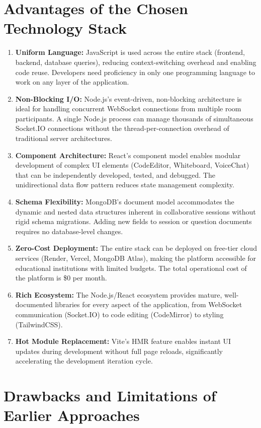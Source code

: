 \section{Advantages of the Chosen Technology Stack}

\begin{enumerate}[label=\arabic*.]
    \item \textbf{Uniform Language:} JavaScript is used across the entire stack (frontend, backend, database queries), reducing context-switching overhead and enabling code reuse. Developers need proficiency in only one programming language to work on any layer of the application.
    \item \textbf{Non-Blocking I/O:} Node.js's event-driven, non-blocking architecture is ideal for handling concurrent WebSocket connections from multiple room participants. A single Node.js process can manage thousands of simultaneous Socket.IO connections without the thread-per-connection overhead of traditional server architectures.
    \item \textbf{Component Architecture:} React's component model enables modular development of complex UI elements (CodeEditor, Whiteboard, VoiceChat) that can be independently developed, tested, and debugged. The unidirectional data flow pattern reduces state management complexity.
    \item \textbf{Schema Flexibility:} MongoDB's document model accommodates the dynamic and nested data structures inherent in collaborative sessions without rigid schema migrations. Adding new fields to session or question documents requires no database-level changes.
    \item \textbf{Zero-Cost Deployment:} The entire stack can be deployed on free-tier cloud services (Render, Vercel, MongoDB Atlas), making the platform accessible for educational institutions with limited budgets. The total operational cost of the platform is \$0 per month.
    \item \textbf{Rich Ecosystem:} The Node.js/React ecosystem provides mature, well-documented libraries for every aspect of the application, from WebSocket communication (Socket.IO) to code editing (CodeMirror) to styling (TailwindCSS).
    \item \textbf{Hot Module Replacement:} Vite's HMR feature enables instant UI updates during development without full page reloads, significantly accelerating the development iteration cycle.
\end{enumerate}

\section{Drawbacks and Limitations of Earlier Approaches}

